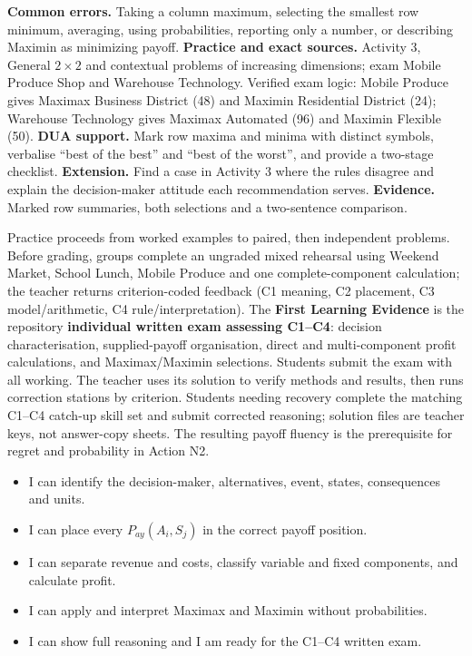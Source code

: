 \documentclass[10pt,letterpaper]{article}
\newcommand{\partheading}[1]{\Needspace{7\baselineskip}\par\vspace{4pt}{\bfseries #1\par}}
\newcommand{\evidenceitem}[1]{\item[$\square$] #1}
\begin{document}
\textbf{Common errors.} Taking a column maximum, selecting the smallest row
minimum, averaging, using probabilities, reporting only a number, or describing
Maximin as minimizing payoff. \textbf{Practice and exact sources.} Activity 3,
General $2\times2$ and contextual problems of increasing dimensions; exam
Mobile Produce Shop and Warehouse Technology. Verified exam logic: Mobile
Produce gives Maximax Business District (48) and Maximin Residential District
(24); Warehouse Technology gives Maximax Automated (96) and Maximin Flexible
(50). \textbf{DUA support.} Mark row maxima and minima with distinct symbols,
verbalise ``best of the best'' and ``best of the worst'', and provide a
two-stage checklist. \textbf{Extension.} Find a case in Activity 3 where the
rules disagree and explain the decision-maker attitude each recommendation
serves. \textbf{Evidence.} Marked row summaries, both selections and a
two-sentence comparison.

\partheading{Practice and Assessment---First Learning Evidence}
Practice proceeds from worked examples to paired, then independent problems.
Before grading, groups complete an ungraded mixed rehearsal using Weekend
Market, School Lunch, Mobile Produce and one complete-component calculation;
the teacher returns criterion-coded feedback (C1 meaning, C2 placement, C3
model/arithmetic, C4 rule/interpretation). The \textbf{First Learning Evidence}
is the repository \textbf{individual written exam assessing C1--C4}: decision
characterisation, supplied-payoff organisation, direct and multi-component
profit calculations, and Maximax/Maximin selections. Students submit the exam
with all working. The teacher uses its solution to verify methods and results,
then runs correction stations by criterion. Students needing recovery complete
the matching C1--C4 catch-up skill set and submit corrected reasoning; solution
files are teacher keys, not answer-copy sheets. The resulting payoff fluency is
the prerequisite for regret and probability in Action N2.

\partheading{Exit Ticket N1}
\begin{itemize}[leftmargin=1.8em,itemsep=1pt]
\evidenceitem{I can identify the decision-maker, alternatives, event, states, consequences and units.}
\evidenceitem{I can place every $P_{ay}(A_i,S_j)$ in the correct payoff position.}
\evidenceitem{I can separate revenue and costs, classify variable and fixed components, and calculate profit.}
\evidenceitem{I can apply and interpret Maximax and Maximin without probabilities.}
\evidenceitem{I can show full reasoning and I am ready for the C1--C4 written exam.}
\end{itemize}
\end{document}
